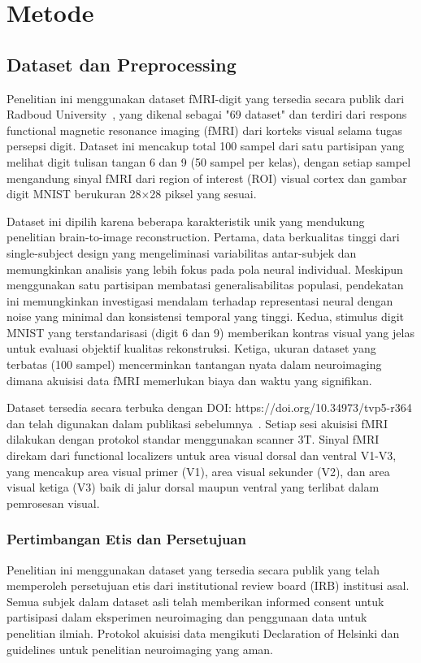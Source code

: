 \section{Metode}

\subsection{Dataset dan Preprocessing}

Penelitian ini menggunakan dataset fMRI-digit yang tersedia secara publik dari Radboud University~\cite{seeliger2018dataset}, yang dikenal sebagai "69 dataset" dan terdiri dari respons functional magnetic resonance imaging (fMRI) dari korteks visual selama tugas persepsi digit. Dataset ini mencakup total 100 sampel dari satu partisipan yang melihat digit tulisan tangan 6 dan 9 (50 sampel per kelas), dengan setiap sampel mengandung sinyal fMRI dari region of interest (ROI) visual cortex dan gambar digit MNIST berukuran 28×28 piksel yang sesuai.

Dataset ini dipilih karena beberapa karakteristik unik yang mendukung penelitian brain-to-image reconstruction. Pertama, data berkualitas tinggi dari single-subject design yang mengeliminasi variabilitas antar-subjek dan memungkinkan analisis yang lebih fokus pada pola neural individual. Meskipun menggunakan satu partisipan membatasi generalisabilitas populasi, pendekatan ini memungkinkan investigasi mendalam terhadap representasi neural dengan noise yang minimal dan konsistensi temporal yang tinggi. Kedua, stimulus digit MNIST yang terstandarisasi (digit 6 dan 9) memberikan kontras visual yang jelas untuk evaluasi objektif kualitas rekonstruksi. Ketiga, ukuran dataset yang terbatas (100 sampel) mencerminkan tantangan nyata dalam neuroimaging dimana akuisisi data fMRI memerlukan biaya dan waktu yang signifikan.

Dataset tersedia secara terbuka dengan DOI: https://doi.org/10.34973/tvp5-r364 dan telah digunakan dalam publikasi sebelumnya~\cite{seeliger2018generative}. Setiap sesi akuisisi fMRI dilakukan dengan protokol standar menggunakan scanner 3T. Sinyal fMRI direkam dari functional localizers untuk area visual dorsal dan ventral V1-V3, yang mencakup area visual primer (V1), area visual sekunder (V2), dan area visual ketiga (V3) baik di jalur dorsal maupun ventral yang terlibat dalam pemrosesan visual.

\subsubsection{Pertimbangan Etis dan Persetujuan}
Penelitian ini menggunakan dataset yang tersedia secara publik yang telah memperoleh persetujuan etis dari institutional review board (IRB) institusi asal. Semua subjek dalam dataset asli telah memberikan informed consent untuk partisipasi dalam eksperimen neuroimaging dan penggunaan data untuk penelitian ilmiah. Protokol akuisisi data mengikuti Declaration of Helsinki dan guidelines untuk penelitian neuroimaging yang aman.

